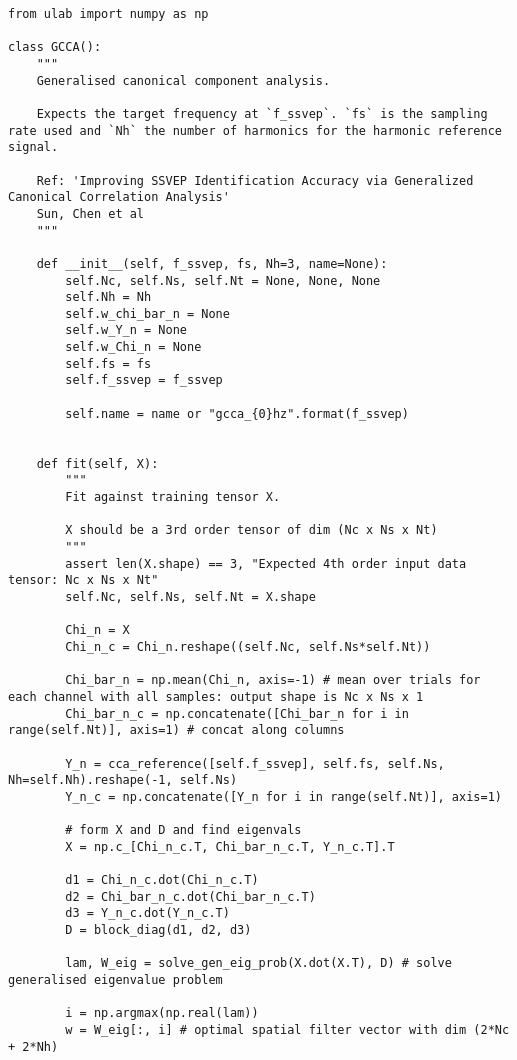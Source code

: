 \begin{listing}[h]
\footnotesize
\begin{verbatim}
from ulab import numpy as np

class GCCA():
    """
    Generalised canonical component analysis.
    
    Expects the target frequency at `f_ssvep`. `fs` is the sampling rate used and `Nh` the number of harmonics for the harmonic reference signal. 
    
    Ref: 'Improving SSVEP Identification Accuracy via Generalized Canonical Correlation Analysis'
    Sun, Chen et al
    """
    
    def __init__(self, f_ssvep, fs, Nh=3, name=None):
        self.Nc, self.Ns, self.Nt = None, None, None
        self.Nh = Nh
        self.w_chi_bar_n = None
        self.w_Y_n = None
        self.w_Chi_n = None
        self.fs = fs
        self.f_ssvep = f_ssvep
        
        self.name = name or "gcca_{0}hz".format(f_ssvep)
            
        
    def fit(self, X):
        """
        Fit against training tensor X.
        
        X should be a 3rd order tensor of dim (Nc x Ns x Nt)
        """
        assert len(X.shape) == 3, "Expected 4th order input data tensor: Nc x Ns x Nt"
        self.Nc, self.Ns, self.Nt = X.shape
        
        Chi_n = X
        Chi_n_c = Chi_n.reshape((self.Nc, self.Ns*self.Nt))

        Chi_bar_n = np.mean(Chi_n, axis=-1) # mean over trials for each channel with all samples: output shape is Nc x Ns x 1
        Chi_bar_n_c = np.concatenate([Chi_bar_n for i in range(self.Nt)], axis=1) # concat along columns

        Y_n = cca_reference([self.f_ssvep], self.fs, self.Ns, Nh=self.Nh).reshape(-1, self.Ns)
        Y_n_c = np.concatenate([Y_n for i in range(self.Nt)], axis=1)

        # form X and D and find eigenvals
        X = np.c_[Chi_n_c.T, Chi_bar_n_c.T, Y_n_c.T].T

        d1 = Chi_n_c.dot(Chi_n_c.T)
        d2 = Chi_bar_n_c.dot(Chi_bar_n_c.T)
        d3 = Y_n_c.dot(Y_n_c.T)
        D = block_diag(d1, d2, d3)

        lam, W_eig = solve_gen_eig_prob(X.dot(X.T), D) # solve generalised eigenvalue problem

        i = np.argmax(np.real(lam))
        w = W_eig[:, i] # optimal spatial filter vector with dim (2*Nc + 2*Nh)
        

\end{verbatim}
\end{listing}
